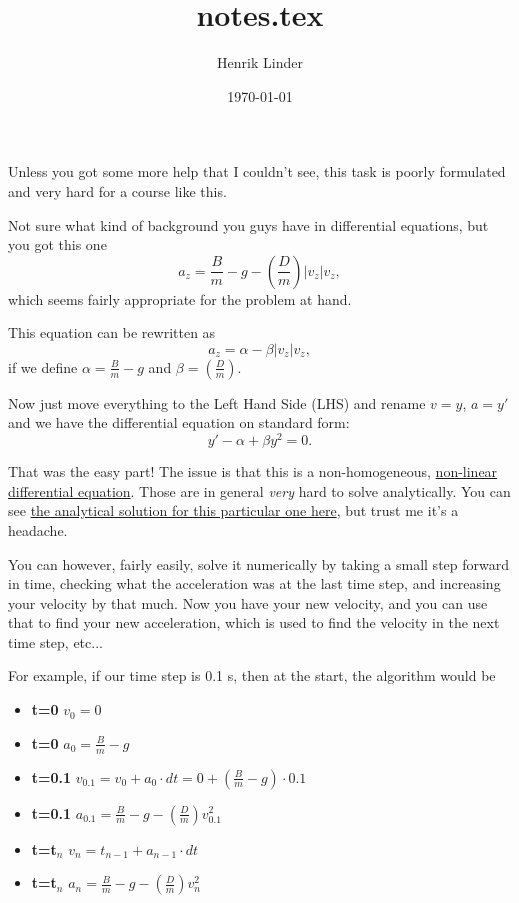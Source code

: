 \documentclass{article}
\title{notes.tex }
\author{Henrik Linder}
\date{\today}
\begin{document}
\maketitle

Unless you got some more help that I couldn't see, this task is poorly formulated and very hard for a course like this.

Not sure what kind of background you guys have in differential equations, but you got this one
\begin{equation}
	a_z = \frac{B}{m} - g - \left(\frac{D}{m}\right)  \left| v_z\right| v_z, 
\end{equation}
which seems fairly appropriate for the problem at hand.

This equation can be rewritten as 
\begin{equation}
	a_z = \alpha - \beta  \left| v_z\right| v_z, 
\end{equation}
if we define $\alpha = \frac{B}{m} - g$ and $\beta = \left(\frac{D}{m}\right)$. 

Now just move everything to the Left Hand Side (LHS) and rename $v = y$, $a = y'$ and we have the differential equation on standard form: 
\begin{equation}
	y' - \alpha + \beta y^2 = 0 .
\end{equation}

That was the easy part! The issue is that this is a non-homogeneous, \href{https://en.wikipedia.org/wiki/Differential\_equation#Non-linear\_differential\_equations}{non-linear differential equation}. Those are in general \textit{very} hard to solve analytically. You can see \href{https://www.wolframalpha.com/input?i=y\%27++-+alpha+\%2B+beta+*+y\%5E2+\%3D+0}{the analytical solution for this particular one here}, but trust me it's a headache. 


You can however, fairly easily, solve it numerically by taking a small step forward in time, checking what the acceleration was at the last time step, and increasing your velocity by that much. Now you have your new velocity, and you can use that to find your new acceleration, which is used to find the velocity in the next time step, etc... 

For example, if our time step is 0.1 s, then at the start, the algorithm would be 
\begin{itemize}
	\item \textbf{t=0   \quad   }    $v_0=0$
	\item \textbf{t=0   \quad   }    $a_0=\frac{B}{m} - g$
	\item \textbf{t=0.1\quad}  $v_{0.1}=v_0+a_0\cdot dt = 0 + (\frac{B}{m} - g)\cdot 0.1$
	\item \textbf{t=0.1\quad}  $a_{0.1}=\frac{B}{m} - g - \left(\frac{D}{m}\right) v_{0.1}^2$
	\item \textbf{t=t$_n$   \quad   }    $v_n = t_{n-1} + a_{n-1}\cdot dt$
	\item \textbf{t=t$_n$   \quad   }    $a_{n}=\frac{B}{m} - g - \left(\frac{D}{m}\right) v_{n}^2  $
\end{itemize}
\end{document}
